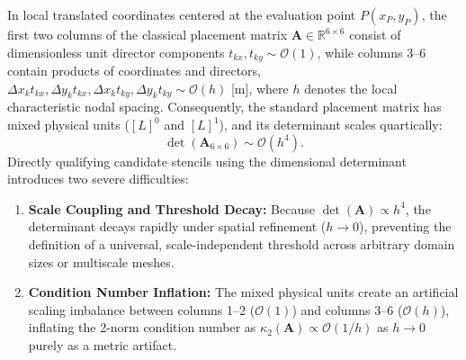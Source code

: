 \documentclass[preprint,12pt]{elsarticle}
\begin{document}
In local translated coordinates centered at the evaluation point $P(x_P, y_P)$, the first two columns of the classical placement matrix $\mathbf{A} \in \mathbb{R}^{6 \times 6}$ consist of dimensionless unit director components $t_{kx}, t_{ky} \sim \mathcal{O}(1)$, while columns 3--6 contain products of coordinates and directors, $\Delta x_k t_{kx}, \Delta y_k t_{kx}, \Delta x_k t_{ky}, \Delta y_k t_{ky} \sim \mathcal{O}(h)$ [m], where $h$ denotes the local characteristic nodal spacing. Consequently, the standard placement matrix has mixed physical units ($[L]^0$ and $[L]^1$), and its determinant scales quartically:
\begin{equation}
    \det(\mathbf{A}_{6\times6}) \sim \mathcal{O}(h^4).
    \label{eq:det_quartic_scaling}
\end{equation}
Directly qualifying candidate stencils using the dimensional determinant introduces two severe difficulties:
\begin{enumerate}
    \item \textbf{Scale Coupling and Threshold Decay:} Because $\det(\mathbf{A}) \propto h^4$, the determinant decays rapidly under spatial refinement ($h \to 0$), preventing the definition of a universal, scale-independent threshold across arbitrary domain sizes or multiscale meshes.
    \item \textbf{Condition Number Inflation:} The mixed physical units create an artificial scaling imbalance between columns 1--2 ($\mathcal{O}(1)$) and columns 3--6 ($\mathcal{O}(h)$), inflating the 2-norm condition number as $\kappa_2(\mathbf{A}) \propto \mathcal{O}(1/h)$ as $h \to 0$ purely as a metric artifact.
\end{enumerate}
\end{document}

